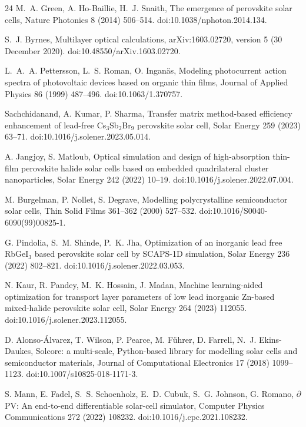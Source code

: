 \documentclass[preprint,12pt]{elsarticle}
\begin{document}
\begin{thebibliography}{24}
 M.~A. Green, A. Ho-Baillie, H.~J. Snaith, The emergence
of perovskite solar cells, Nature Photonics 8 (2014) 506--514.
doi:10.1038/nphoton.2014.134.

 S.~J. Byrnes, Multilayer optical calculations,
arXiv:1603.02720, version 5 (30 December 2020). doi:10.48550/arXiv.1603.02720.

 L.~A.~A. Pettersson, L.~S. Roman, O. Ingan\"{a}s,
Modeling photocurrent action spectra of photovoltaic devices based on organic
thin films, Journal of Applied Physics 86 (1999) 487--496.
doi:10.1063/1.370757.

 Sachchidanand, A. Kumar, P. Sharma, Transfer
matrix method-based efficiency enhancement of lead-free Cs$_3$Sb$_2$Br$_9$
perovskite solar cell, Solar Energy 259 (2023) 63--71.
doi:10.1016/j.solener.2023.05.014.

 A. Jangjoy, S. Matloub, Optical simulation and design of
high-absorption thin-film perovskite halide solar cells based on embedded
quadrilateral cluster nanoparticles, Solar Energy 242 (2022) 10--19.
doi:10.1016/j.solener.2022.07.004.

 M. Burgelman, P. Nollet, S. Degrave, Modelling
polycrystalline semiconductor solar cells, Thin Solid Films 361--362 (2000)
527--532. doi:10.1016/S0040-6090(99)00825-1.

 G. Pindolia, S.~M. Shinde, P.~K. Jha, Optimization of
an inorganic lead free RbGeI$_3$ based perovskite solar cell by SCAPS-1D
simulation, Solar Energy 236 (2022) 802--821.
doi:10.1016/j.solener.2022.03.053.

 N. Kaur, R. Pandey, M.~K. Hossain, J. Madan,
Machine learning-aided optimization for transport layer parameters of low
lead inorganic Zn-based mixed-halide perovskite solar cell, Solar Energy 264
(2023) 112055. doi:10.1016/j.solener.2023.112055.

 D. Alonso-\'{A}lvarez, T. Wilson, P. Pearce, M. F\"{u}hrer, D. Farrell, N.~J. Ekins-Daukes, Solcore: a multi-scale, Python-based library for modelling solar cells and semiconductor materials, Journal of Computational Electronics 17 (2018) 1099--1123. doi:10.1007/s10825-018-1171-3.

 S. Mann, E. Fadel, S.~S. Schoenholz, E.~D. Cubuk,
S.~G. Johnson, G. Romano, $\partial$PV: An end-to-end differentiable
solar-cell simulator, Computer Physics Communications 272 (2022) 108232.
doi:10.1016/j.cpc.2021.108232.


\end{thebibliography}
\end{document}
